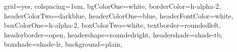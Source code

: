 \documentclass[portrait,final,a0paper]{baposter}
\begin{document}
\newlength{\leftimgwidth}
\begin{poster}%
  {
  grid=yes,
  colspacing=1em,
  bgColorOne=white,  %
  borderColor=h-alpha-2,		%
  headerColorTwo=darkblue,	%
  headerColorOne=blue,
  headerFontColor=white,
  boxColorOne=h-alpha-2,
  boxColorTwo=white,
  textborder=roundedleft,  %
  headerborder=open,%
  headershape=roundedright,
  headershade=shade-tb, %
  boxshade=shade-lr,
  background=plain,
}
\end{poster}
\end{document}
